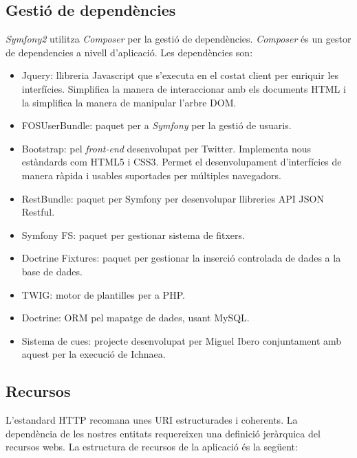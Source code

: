 \subsection{Gesti\'{o} de depend\`{e}ncies} 
\textit{Symfony2} utilitza \textit{Composer} per la gesti\'{o} de depend\`{e}ncies.\cite{composer} \textit{Composer} \'{e}s un gestor de dependencies a nivell d'aplicaci\'{o}. Les depend\`{e}ncies son:
\begin{itemize}
\item Jquery: llibreria Javascript que s'executa en el costat client per enriquir les interfícies. Simplifica la manera de interaccionar amb els documents HTML i la simplifica la manera de manipular l'arbre DOM.\cite{jquery}
\item FOSUserBundle: paquet per a \textit{Symfony} per la gesti\'{o} de usuaris.\cite{fosuserbundle}
\item Bootstrap:  pel \textit{front-end} desenvolupat per Twitter. Implementa nous estàndards com HTML5 i CSS3. Permet el desenvolupament d'interf\'{i}cies de manera r\`{a}pida i usables suportades per múltiples navegadors.
\item RestBundle: paquet per Symfony per desenvolupar llibreries API JSON Restful.\cite{apijson}
\item Symfony FS: paquet per gestionar sistema de fitxers.
\item Doctrine Fixtures: paquet per gestionar la inserci\'{o} controlada de dades a la base de dades.
\item TWIG: motor de plantilles per a PHP.\cite{twig}
\item Doctrine: ORM pel mapatge de dades, usant MySQL.\cite{mysql}
\item Sistema de cues: projecte desenvolupat per Miguel Ibero conjuntament amb aquest per la execució de Ichnaea.
\end{itemize}

\subsection{Recursos}
L'estandard HTTP recomana unes URI estructurades i coherents.\cite{rfc3986} La dependència de les nostres entitats requereixen una definició jeràrquica del recursos webs. La estructura de recursos de la aplicaci\'{o} \'{e}s la següent:\\

